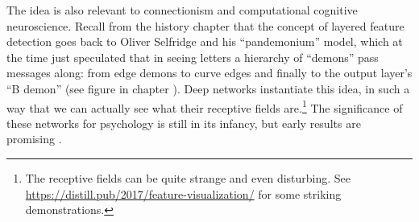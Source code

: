 The idea is also relevant to connectionism and computational cognitive neuroscience. Recall from the history chapter that the concept of layered feature detection goes back to Oliver Selfridge and his ``pandemonium'' model, which at the time just speculated that in seeing letters a hierarchy of ``demons'' pass messages along: from edge demons to curve edges and finally to the output layer's ``B demon'' (see figure  in chapter ). Deep networks instantiate this idea, in such a way that we can actually  see what their receptive fields are.\footnote{The receptive fields can be quite strange and even disturbing. See \url{https://distill.pub/2017/feature-visualization/} for some striking demonstrations.}  The significance of these networks for psychology is still in its infancy, but early results are promising \cite{zorzi2013modeling, ritter2017cognitive}.

